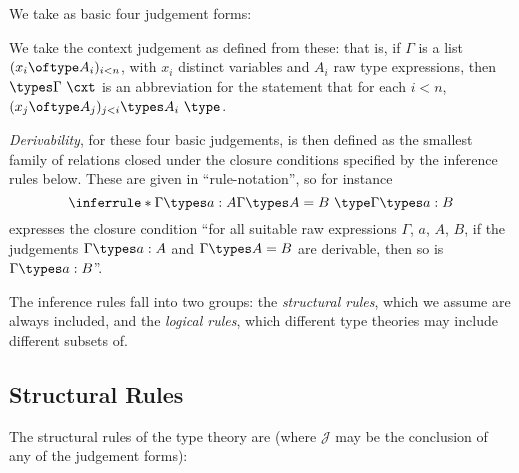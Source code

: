 We take as basic four judgement forms:
We take the context judgement as defined from these: that is, if $\Gamma$ is a list $(x_i \oftype A_i)_{i < n}$, with $x_i$ distinct variables and $A_i$ raw type expressions, then $\types \Gamma\ \cxt$ is an abbreviation for the statement that for each $i < n$, $(x_j \oftype A_j)_{j < i} \types A_i\ \type$.

\emph{Derivability}, for these four basic judgements, is then defined as the smallest family of relations closed under the closure conditions specified by the inference rules below.
%
These are given in “rule-notation”, so for instance
\[
  \inferrule*{\Gamma \types a : A \\ \Gamma \types A = B \ \type}{\Gamma \types a : B}
\]
expresses the closure condition “for all suitable raw expressions $\Gamma$, $a$, $A$, $B$, if the judgements $\Gamma \types a : A$ and $\Gamma \types A = B$ are derivable, then so is $\Gamma \types a : B$”.

The inference rules fall into two groups: the \emph{structural rules}, which we assume are always included, and the \emph{logical rules}, which different type theories may include different subsets of.

\subsection{Structural Rules} \label{subsec:structural-rules}
The structural rules of the type theory are (where $\mathcal{J}$ may be the conclusion of any of the judgement forms):


